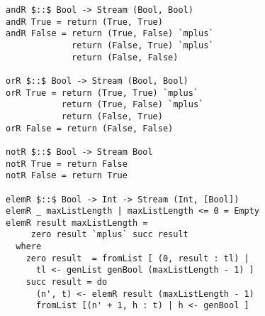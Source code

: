 \begin{figure}[!t]
  \centering
  \begin{minipage}{0.49\textwidth}
    \begin{lstlisting}[label={prop_helpers}, caption={Functions used in logic formulas generation}, captionpos=b, frame=tb]
andR $::$ Bool -> Stream (Bool, Bool)
andR True = return (True, True)
andR False = return (True, False) `mplus`
             return (False, True) `mplus`
             return (False, False)

orR $::$ Bool -> Stream (Bool, Bool)
orR True = return (True, True) `mplus`
           return (True, False) `mplus`
           return (False, True)
orR False = return (False, False)

notR $::$ Bool -> Stream Bool
notR True = return False
notR False = return True

elemR $::$ Bool -> Int -> Stream (Int, [Bool])
elemR _ maxListLength | maxListLength <= 0 = Empty
elemR result maxListLength =
     zero result `mplus` succ result
  where
    zero result  = fromList [ (0, result : tl) |
      tl <- genList genBool (maxListLength - 1) ]
    succ result = do
      (n', t) <- elemR result (maxListLength - 1)
      fromList [(n' + 1, h : t) | h <- genBool ]
    \end{lstlisting}
  \end{minipage}
\end{figure}


